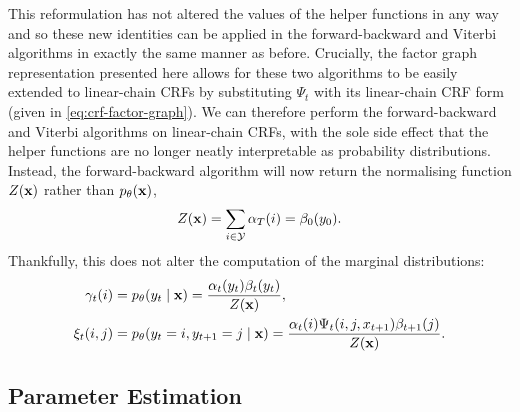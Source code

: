 \documentclass[../main.tex]{subfiles}
\begin{document}
This reformulation has not altered the values of the helper functions in any way and so these new identities can be applied in the forward-backward and Viterbi algorithms in exactly the same manner as before.
Crucially, the factor graph representation presented here allows for these two algorithms to be easily extended to linear-chain CRFs by substituting $\Psi_t$ with its linear-chain CRF form (given in \cref{eq:crf-factor-graph}).
We can therefore perform the forward-backward and Viterbi algorithms on linear-chain CRFs, with the sole side effect that the helper functions are no longer neatly interpretable as probability distributions.
Instead, the forward-backward algorithm will now return the normalising function $Z(\mathbf{x})$ rather than $p_\theta(\mathbf{x})$,
\begin{equation*}
    Z(\mathbf{x}) = \sum_{i \in \mathcal{Y}}\alpha_T(i) = \beta_0(y_0).
\end{equation*}
Thankfully, this does not alter the computation of the marginal distributions:
\begin{align*}
    \gamma_t(i) &= p_\theta(y_t \mid \mathbf{x}) = \frac{\alpha_t(y_t)\beta_t(y_t)}{Z(\mathbf{x})}, \\
    \xi_t(i,j) &= p_\theta(y_t=i,y_{t+1}=j\mid \mathbf{x}) = \frac{\alpha_{t}(i)\Psi_t(i,j,x_{t+1})\beta_{t+1}(j)}{Z(\mathbf{x})}.
\end{align*}

\subsection{Parameter Estimation}
\end{document}
